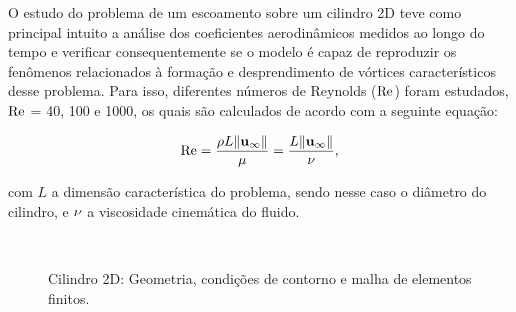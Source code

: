 \documentclass[tese_patricia]{subfiles}%
\begin{document}
O estudo do problema de um escoamento sobre um cilindro 2D teve como principal intuito a análise dos coeficientes aerodinâmicos medidos ao longo do tempo e verificar consequentemente se o modelo é capaz de reproduzir os fenômenos relacionados à formação e desprendimento de vórtices característicos desse problema. Para isso, diferentes números de Reynolds ($\mathrm{Re}$) foram estudados, $\mathrm{Re}$ = 40, 100 e 1000, os quais são calculados de acordo com a seguinte equação:

\begin{align}
	\mathrm{Re} = \frac{\rho L \lVert\mathbf{u}_{\infty}\lVert}{\mu} = \frac{L \lVert \mathbf{u}_{\infty} \lVert}{\nu}, \label{eq:Reynolds}
\end{align}

\noindent com $L$ a dimensão característica do problema, sendo nesse caso o diâmetro do cilindro, e $\nu$ a viscosidade cinemática do fluido. 

\begin{figure}[!htb]
	\centering
	\\
	\caption{Cilindro 2D: Geometria, condições de contorno e malha de elementos finitos.}
\end{figure}
\end{document}
